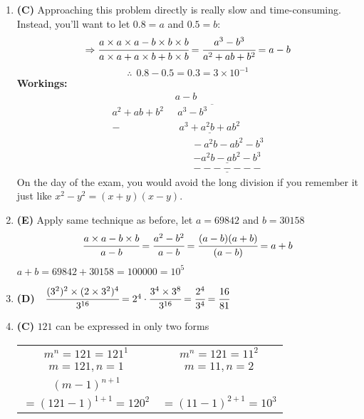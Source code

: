 \begin{multicols}{2}
\begin{enumerate}[label={\arabic*.}]
    \item \textbf{(C)} Approaching this problem directly is really slow and time-consuming. Instead, you'll want to let \( 0.8 = a \) and \( 0.5 = b \):
    \[\Rightarrow \cfrac{a \times a \times a - b \times b \times b}{a \times a + a \times b + b \times b} = \cfrac{a^3 - b^3}{a^2 + ab + b^2} = a - b\]
    \[\therefore \hspace{5pt} 0.8 - 0.5 = 0.3 = 3 \times 10^{-1}\]
        \textbf{Workings:} \vspace{-10pt}
        \begin{align*} 
            & a - b\\
            a^2 + ab + b^2 \,\, &\overline{ \hspace{3pt} a^3 - b^3 \hspace{50pt}} \\
            -& \hspace{5pt} \underline{a^3 + a^2b + ab^2} \\ 
            & \hspace{20pt} -a^2b - ab^2 - b^3 \\
            & \hspace{22pt} \underline{-a^2b - ab^2 - b^3} \\
            & \hspace{22pt} \underline{-------}
        \end{align*}
        On the day of the exam, you would avoid the long division if you remember it just like \( x^2 - y^2 = (x+y)(x-y) \). 

    \item \textbf{(E)} Apply same technique as before, let $a = 69842$ and $b = 30158$ \\
    $$\cfrac{a \times a - b \times b }{a - b} = \cfrac{a^2 - b^2}{a-b} = \cfrac{(a-b)(a+b)}{(a-b)} = a+b $$
    $ a + b = 69842 + 30158  = 100000 = 10^5$

    \item \textbf{(D)} \, \,$\cfrac{(3^2)^2 \times (2 \times 3^2)^4}{3^{16}} = 2^4 \cdot \cfrac{3^4 \times 3^8}{3^{16}} = \cfrac{2^4}{3^4} = \cfrac{16}{81}$

    \item \textbf{(C)} $121$ can be expressed in only two forms 
    \begin{tabular}{c|c}
        $m^n = 121 = 121^1$ & $m^n = 121 = 11^2$ \\
        $m = 121, n = 1$& $m = 11, n = 2$ \\
        $(m-1)^{n+1}$ & \\
            $= (121-1)^{1+1} = 120^2$ & $=(11 - 1)^{2+1} = 10^3$ \\    
    \end{tabular}


\end{enumerate}
\end{multicols}
